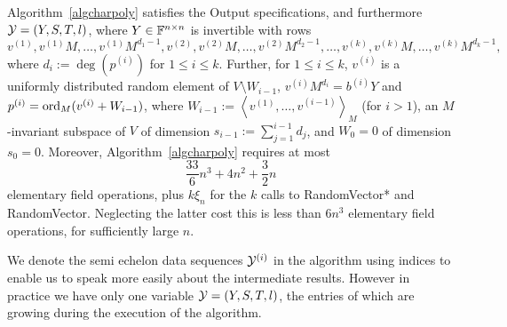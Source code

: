 \begin{Prop}
\label{propcharpoly}
%
Algorithm~\ref{algcharpoly} satisfies
the Output specifications, and furthermore
$\mathcal{Y}=(Y,S,T,l)$, where
$Y \in \mathbb{F}^{n \times n}$ is invertible with rows
\[ v\!^{(1)}, v\!^{(1)}M, \ldots, v\!^{(1)}M^{d_1-1}, 
v\!^{(2)}, v\!^{(2)}M, \ldots, v\!^{(2)}M^{d_2-1},
   \ldots, v\!^{(k)}, v\!^{(k)}M, \ldots, v\!^{(k)} M^{d_k-1},
\]
where $d_i := \deg(p^{(i)})$ for $1 \le i \le k$. Further, for $1 \le i \le k$,
$v^{(i)}$ is a uniformly distributed random element of\/ $V\setminus W_{i-1}$, 
$v^{(i)} M^{d_i} = b^{(i)} Y$ and $p^{(i)} = \mathrm{ord}_M(v^{(i)} + W_{i-1})$,
where $W_{i-1} := \left< v^{(1)}, \ldots, v^{(i-1)}\right>_M$ (for $i>1$), 
an $M$-invariant subspace of $V$ of dimension $s_{i-1}:=\sum_{j=1}^{i-1} d_j$, and 
$W_0=0$ of dimension $s_0=0$.
Moreover, Algorithm~\ref{algcharpoly} requires at most
\[
\frac{33}{6}n^3+4n^2+\frac{3}{2}n 
\]
elementary field operations, plus
$k\xi_{n}$ for the $k$ calls to {\sc RandomVector*} and {\sc RandomVector}. Neglecting 
the latter cost this  is less than $6n^3$ elementary field operations, for sufficiently large $n$.
\end{Prop}

\begin{Rem}
We denote the semi echelon data sequences 
$\mathcal{Y}^{(i)}$ in the algorithm using indices to enable us to speak 
more easily about the intermediate results. However in practice
we have only one variable $\mathcal{Y}=(Y,S,T,l)$, the entries of which are 
growing during the execution of the algorithm.
\end{Rem}


